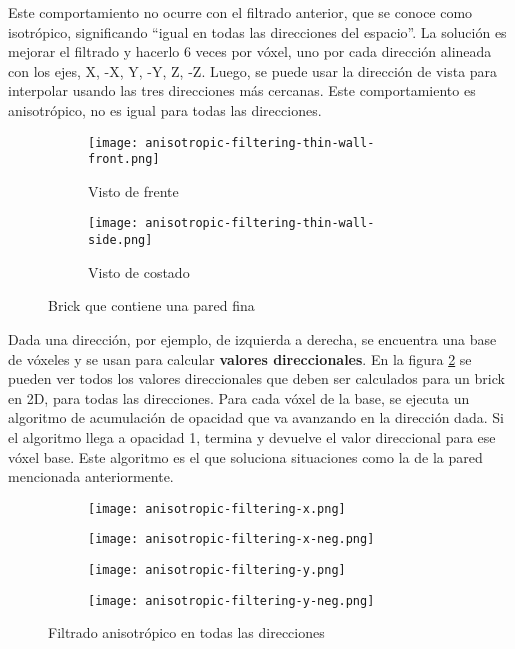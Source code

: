 Este comportamiento no ocurre con el filtrado anterior, que se conoce como isotrópico, significando ``igual en todas las direcciones del espacio''.
La solución es mejorar el filtrado y hacerlo 6 veces por vóxel, uno por cada dirección alineada con los ejes, X, -X, Y, -Y, Z, -Z.
Luego, se puede usar la dirección de vista para interpolar usando las tres direcciones más cercanas.
Este comportamiento es anisotrópico, no es igual para todas las direcciones.

\begin{figure}
    \begin{center}
        \begin{subfigure}{.24\textwidth}
            \texttt{[image: anisotropic-filtering-thin-wall-front.png]}
            \caption{Visto de frente}
        \end{subfigure}
        \begin{subfigure}{.24\textwidth}
            \texttt{[image: anisotropic-filtering-thin-wall-side.png]}
            \caption{Visto de costado}
        \end{subfigure}
        \caption{Brick que contiene una pared fina}
        \label{fig:anisotropic-thin-wall}
    \end{center}
\end{figure}

Dada una dirección, por ejemplo, de izquierda a derecha, se encuentra una base de vóxeles y se usan para calcular \textbf{valores direccionales}.
En la figura \ref{fig:svo_filtering_anisotropic} se pueden ver todos los valores direccionales que deben ser calculados para un brick en 2D, para todas las direcciones.
Para cada vóxel de la base, se ejecuta un algoritmo de acumulación de opacidad que va avanzando en la dirección dada.
Si el algoritmo llega a opacidad 1, termina y devuelve el valor direccional para ese vóxel base.
Este algoritmo es el que soluciona situaciones como la de la pared mencionada anteriormente.

\begin{figure}
    \begin{center}
        \begin{subfigure}{.24\textwidth}
            \texttt{[image: anisotropic-filtering-x.png]}
        \end{subfigure}
        \begin{subfigure}{.24\textwidth}
            \texttt{[image: anisotropic-filtering-x-neg.png]}
        \end{subfigure}
        \begin{subfigure}{.24\textwidth}
            \texttt{[image: anisotropic-filtering-y.png]}
        \end{subfigure}
        \begin{subfigure}{.24\textwidth}
            \texttt{[image: anisotropic-filtering-y-neg.png]}
        \end{subfigure}
    \end{center}
    \caption{Filtrado anisotrópico en todas las direcciones}
    \label{fig:svo_filtering_anisotropic}
\end{figure}

